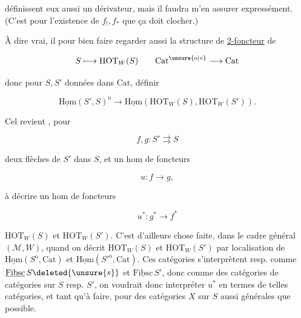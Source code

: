 
définissent eux aussi un dérivateur, mais il faudra m'en assurer expressément. (C'est pour l'existence de $f_!,f_*$ que ça doit clocher.)

À dire vrai,  il  pour bien faire regarder aussi la structure de \uline{2-foncteur} de

\[
S\longmapsto\mathrm{HOT}_W(S)\qquad \mathrm{Cat}^{\unsure{\mathrm o|\circ}}\longrightarrow\mathrm{Cat}
\]

donc pour $S,S'$ données dans $\mathrm{Cat}$, définir

\[
\underline{\mathrm{Hom}}(S',S)^{\mathrm o}\longrightarrow
\underline{\mathrm{Hom}}(\mathrm{HOT}_W(S),\mathrm{HOT}_W(S')).
\]

Cel revient , pour

\[
 f,g:S'\rightrightarrows S
\]

deux flèches de $S'$ dans $S$, et un hom de foncteurs

\[
u:f\longrightarrow g,
\]

à décrire un hom de foncteurs

\[
u^*:g^*\longrightarrow f^*
\]

 $\mathrm{HOT}_W(S)$ et $\mathrm{HOT}_W(S')$. C'est d'ailleurs chose faite, dans le cadre général  $(\mathcal M,W)$, quand on décrit $\mathrm{HOT}_{W}(S)$ et $\mathrm{HOT}_W(S')$ par localisation de $\underline{\mathrm{Hom}}(S^{\mathrm o},\mathrm{Cat})$ et $\underline{\mathrm{Hom}}(S'^{\mathrm o},\mathrm{Cat})$. Ces catégories s'interprètent resp. comme $\underline{\mathrm{Fibsc}}\,S\deleted{\unsure{s}}$ et $\underline{\mathrm{Fibsc}}\,S'$, donc comme des catégories de catégories sur $S$ resp. $S'$, on voudrait donc interpréter $u^*$ en termes de telles catégories, et tant qu'à faire, pour des catégories $X$ sur $S$ aussi générales que possible.  
